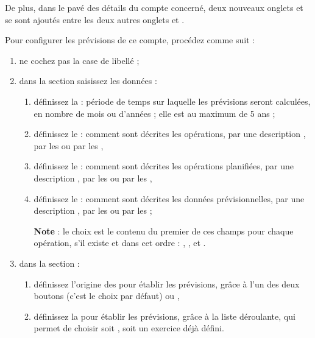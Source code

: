 De plus, dans le pavé des détails du compte concerné, deux nouveaux onglets  et  se sont ajoutés entre les deux autres onglets  et .

Pour configurer les prévisions de ce compte, procédez comme suit :

\begin{enumerate}
	\item ne cochez pas la case de libellé  ;	 
	\item dans la section  saisissez les données :	
		\begin{enumerate}	
			\item définissez la  : période de temps sur laquelle les prévisions seront calculées, en nombre de mois ou d'années ; elle est au maximum de 5 ans ; 
			\item définissez le  : comment sont décrites les opérations, par une description , par les  ou par les ,
			\item définissez le  : comment sont décrites les opérations planifiées, par une description , par les  ou par les ,		
			\item définissez le  : comment sont décrites les données prévisionnelles, par une description , par les  ou par les  ; %
			
			\textbf{Note} : le choix  est le contenu du premier de ces champs pour chaque opération, s'il existe et dans cet ordre : , ,  et .
		\end{enumerate}			
	\item dans la section  :
		\begin{enumerate}	
			\item définissez l'origine des  pour établir les prévisions, grâce à l'un des deux boutons  (c'est le choix par défaut) ou ,
			\item définissez la  pour établir les prévisions, grâce à la liste déroulante, qui permet de choisir soit , soit un exercice déjà défini. %
			

\end{enumerate}
\end{enumerate}
